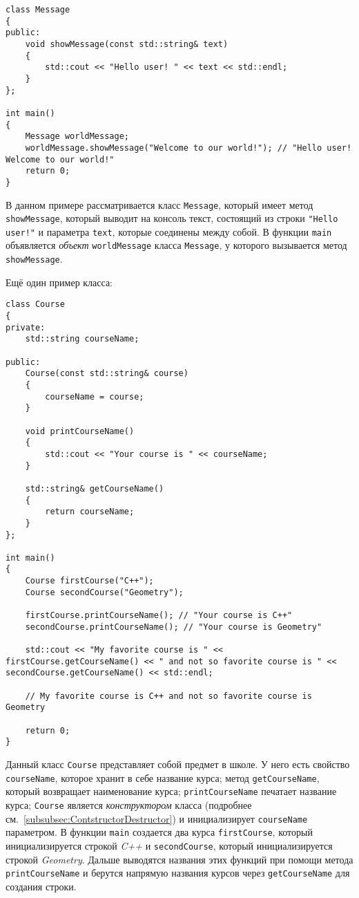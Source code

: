 \begin{lstlisting}
class Message
{
public:
    void showMessage(const std::string& text)
    {
        std::cout << "Hello user! " << text << std::endl;
    }
};

int main()
{
    Message worldMessage;
    worldMessage.showMessage("Welcome to our world!"); // "Hello user! Welcome to our world!"
    return 0;
}
\end{lstlisting}

В данном примере рассматривается класс \lstinline|Message|, который имеет метод \lstinline|showMessage|, который выводит на консоль текст, состоящий из строки \lstinline|"Hello user!"| и параметра \lstinline|text|, которые соединены между собой. В функции \lstinline|main| объявляется \emph{объект} \lstinline|worldMessage| класса \lstinline|Message|, у которого вызывается метод \lstinline|showMessage|.

Ещё один пример класса:
\begin{lstlisting}
class Course
{
private:
    std::string courseName;
    
public:
    Course(const std::string& course)
    {
        courseName = course;
    }

    void printCourseName()
    {
        std::cout << "Your course is " << courseName;
    }
    
    std::string& getCourseName()
    {
        return courseName;
    }
};

int main()
{
    Course firstCourse("C++");
    Course secondCourse("Geometry");
    
    firstCourse.printCourseName(); // "Your course is C++"
    secondCourse.printCourseName(); // "Your course is Geometry"
    
    std::cout << "My favorite course is " << firstCourse.getCourseName() << " and not so favorite course is " << secondCourse.getCourseName() << std::endl;
    
    // My favorite course is C++ and not so favorite course is Geometry
    
    return 0;
}
\end{lstlisting}

Данный класс \lstinline|Course| представляет собой предмет в школе. У него есть свойство \lstinline|courseName|, которое хранит в себе название курса; метод \lstinline|getCourseName|, который возвращает наименование курса; \lstinline|printCourseName| печатает название курса; \lstinline|Course| является \emph{конструктором} класса (подробнее см.~\ref{subsubsec:ContstructorDestructor}) и инициализирует \lstinline|courseName| параметром. В функции \lstinline|main| создается два курса \lstinline|firstCourse|, который инициализируется строкой \emph{C++} и \lstinline|secondCourse|, который инициализируется строкой \emph{Geometry}. Дальше выводятся названия этих функций при помощи метода \lstinline|printCourseName| и берутся напрямую названия курсов через \lstinline|getCourseName| для создания строки.

